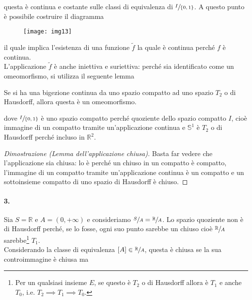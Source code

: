 questa è continua e costante sulle classi di equivalenza di $ \sfrac{I}{\{0,1\}} $. A questo punto è possibile costruire il diagramma

\begin{figure}[H]
	\centering
	\texttt{[image: img13]}
\end{figure}

il quale implica l'esistenza di una funzione $ \tilde{f} $ la quale è continua perché $ f $ è continua.\\
L'applicazione $ \tilde{f} $ è anche iniettiva e suriettiva: perché sia identificato come un omeomorfismo, si utilizza il seguente lemma

\begin{lemma}\label{lemma-clos-app}
	Se si ha una bigezione continua da uno spazio compatto ad uno spazio $ T_{2} $ o di Hausdorff, allora questa è un omeomorfismo.
\end{lemma}

dove $ \sfrac{I}{\{0,1\}} $ è uno spazio compatto perché quoziente dello spazio compatto $ I $, cioè immagine di un compatto tramite un'applicazione continua e $ \mathbb{S}^{1} $ è $ T_{2} $ o di Hausdorff perché incluso in $ \mathbb{R}^{2} $.

\begin{proof}[Dimostrazione (Lemma dell'applicazione chiusa)]
	Basta far vedere che l'applicazione sia chiusa: lo è perché un chiuso in un compatto è compatto, l'immagine di un compatto tramite un'applicazione continua è un compatto e un sottoinsieme compatto di uno spazio di Hausdorff è chiuso.
\end{proof}

\paragraph{3.}

Sia $ S = \mathbb{R} $ e $ A = (0,+\infty) $ e consideriamo $ \sfrac{S}{A} = \sfrac{\mathbb{R}}{A} $. Lo spazio quoziente non è di Hausdorff perché, se lo fosse, ogni suo punto sarebbe un chiuso cioè $ \sfrac{\mathbb{R}}{A} $ sarebbe\footnote{%
	Per un qualsiasi insieme $ E $, se questo è $ T_{2} $ o di Hausdorff allora è $ T_{1} $ e anche $ T_{0} $, i.e. $ T_{2} \implies T_{1} \implies T_{0} $.%
} $ T_{1} $.\\
Considerando la classe di equivalenza $ [A] \in \sfrac{\mathbb{R}}{A} $, questa è chiusa se la sua controimmagine è chiusa ma

